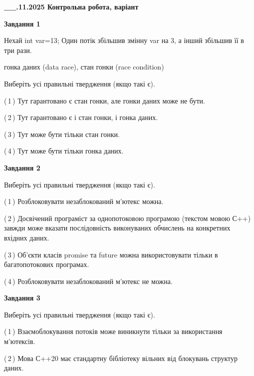 \documentclass[12pt, ukrainian]{article}
\begin{document}
\begin {large}

\textbf{\_\_.11.2025 Контрольна робота, варіант  }\par


{

\begin{center}
\textbf{Завдання 1}
\end{center}
Нехай int var=13; Один потік збільшив змінну var на 3, а інший збільшив її в три рази.

гонка даних (data race), стан гонки (race condition)

Виберіть усі правильні твердження (якщо такі є).\par
\vspace{2mm}
(\,1\,) Тут гарантовано є стан гонки, але гонки даних може не бути.%

(\,2\,) Тут гарантовано є і стан гонки, і гонка даних.%

(\,3\,) Тут може бути тільки стан гонки.%

(\,4\,) Тут може бути тільки гонка даних.%



\begin{center}
\textbf{Завдання 2}
\end{center}
Виберіть усі правильні твердження (якщо такі є).\par
\vspace{2mm}

(\,1\,) Розблоковувати незаблокований м’ютекс можна.%

(\,2\,) Досвічений програміст за однопотоковою програмою (текстом мовою С++) завжди може вказати послідовність виконуваних обчислень на конкретних вхідних даних.%

(\,3\,) Об’єкти класів promise та future можна використовувати тільки в багатопотокових програмах.%

(\,4\,) Розблоковувати незаблокований м’ютекс не можна.%



\begin{center}
\textbf{Завдання 3}
\end{center}
Виберіть усі правильні твердження (якщо такі є).\par
\vspace{2mm}

(\,1\,) Взаємоблокування потоків може виникнути тільки за використання м’ютексів.%

(\,2\,) Мова С++20 має стандартну бібліотеку вільних від блокувань структур даних.%

}
\end{large}
\end{document}
